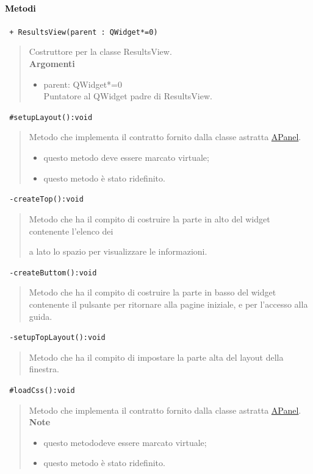 \paragraph{\textcolor{black}{Metodi\\}}
\color{blue}\verb! + ResultsView(parent : QWidget*=0)!
\begin{quote}
\color{black}Costruttore per la classe ResultsView. \\
\textbf{Argomenti}
\begin{itemize}
\item parent: QWidget*=0  \\ Puntatore al QWidget padre di ResultsView.
\end{itemize}
\end{quote}
\color{blue}\verb! #setupLayout():void!
\begin{quote}
\color{black} Metodo che implementa il contratto fornito dalla classe astratta \hyperref[speAPanel]{APanel}.
\begin{itemize}
\item questo metodo deve essere marcato virtuale;
\item questo metodo è stato ridefinito.
\end{itemize}
\end{quote} 
\color{blue}\verb! -createTop():void!
\begin{quote}
\color{black} Metodo che ha il compito di costruire la parte in alto del widget contenente l'elenco dei \subject e a lato lo spazio per visualizzare le informazioni.
\end{quote} 
\color{blue}\verb! -createButtom():void!
\begin{quote}
\color{black} Metodo che ha il compito di costruire la parte in basso del widget contenente il pulsante per ritornare alla pagine iniziale, e per l'accesso alla guida.
\end{quote}
\color{blue}\verb! -setupTopLayout():void!
\begin{quote}
\color{black} Metodo che ha il compito di impostare la parte alta del layout della finestra.
\end{quote}  
\color{blue}\verb! #loadCss():void!
\begin{quote}
\color{black} Metodo che implementa il contratto fornito dalla classe astratta \hyperref[speAPanel]{APanel}.\\
 \textbf{Note}
 \begin{itemize}
  \item questo metododeve essere marcato virtuale;
 \item questo metodo è stato ridefinito.
 \end{itemize}
\end{quote} 
